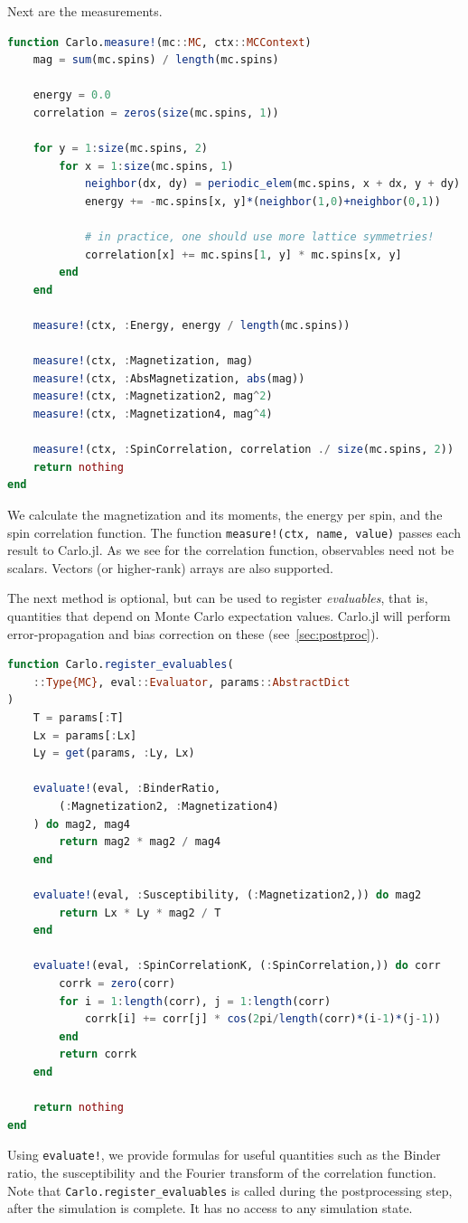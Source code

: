 \documentclass{SciPost}
\begin{document}
Next are the measurements.
\begin{lstlisting}[language=julia]
function Carlo.measure!(mc::MC, ctx::MCContext)
    mag = sum(mc.spins) / length(mc.spins)

    energy = 0.0
    correlation = zeros(size(mc.spins, 1))

    for y = 1:size(mc.spins, 2)
        for x = 1:size(mc.spins, 1)
            neighbor(dx, dy) = periodic_elem(mc.spins, x + dx, y + dy)
            energy += -mc.spins[x, y]*(neighbor(1,0)+neighbor(0,1))

            # in practice, one should use more lattice symmetries!
            correlation[x] += mc.spins[1, y] * mc.spins[x, y]
        end
    end

    measure!(ctx, :Energy, energy / length(mc.spins))

    measure!(ctx, :Magnetization, mag)
    measure!(ctx, :AbsMagnetization, abs(mag))
    measure!(ctx, :Magnetization2, mag^2)
    measure!(ctx, :Magnetization4, mag^4)

    measure!(ctx, :SpinCorrelation, correlation ./ size(mc.spins, 2))
    return nothing
end
\end{lstlisting}
We calculate the magnetization and its moments, the energy per spin, and the spin correlation function. The function \texttt{measure!(ctx, name, value)} passes each result to Carlo.jl. As we see for the correlation function, observables need not be scalars. Vectors (or higher-rank) arrays are also supported.

The next method is optional, but can be used to register \textit{evaluables}, that is, quantities that depend on Monte Carlo expectation values. Carlo.jl will perform error-propagation and bias correction on these (see~\cref{sec:postproc}).
\begin{lstlisting}[language=julia]
function Carlo.register_evaluables(
	::Type{MC}, eval::Evaluator, params::AbstractDict
)
    T = params[:T]
    Lx = params[:Lx]
    Ly = get(params, :Ly, Lx)

    evaluate!(eval, :BinderRatio,
        (:Magnetization2, :Magnetization4)
    ) do mag2, mag4
        return mag2 * mag2 / mag4
    end

    evaluate!(eval, :Susceptibility, (:Magnetization2,)) do mag2
        return Lx * Ly * mag2 / T
    end

    evaluate!(eval, :SpinCorrelationK, (:SpinCorrelation,)) do corr
        corrk = zero(corr)
        for i = 1:length(corr), j = 1:length(corr)
            corrk[i] += corr[j] * cos(2pi/length(corr)*(i-1)*(j-1))
        end
        return corrk
    end

    return nothing
end
\end{lstlisting}
Using \texttt{evaluate!}, we provide formulas for useful quantities such as the Binder ratio, the susceptibility and the Fourier transform of the correlation function. Note that \texttt{Carlo.register\_{}evaluables} is called during the postprocessing step, after the simulation is complete. It has no access to any simulation state.
\end{document}
